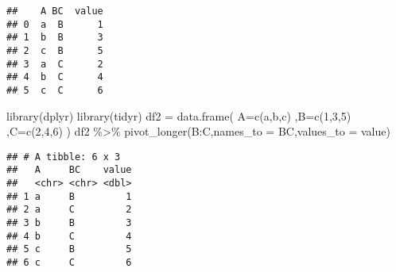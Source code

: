\documentclass[
]{article}
\newenvironment{Shaded}{\begin{snugshade}}{\end{snugshade}}
\newcommand{\AttributeTok}[1]{\textcolor[rgb]{0.77,0.63,0.00}{#1}}
\newcommand{\DecValTok}[1]{\textcolor[rgb]{0.00,0.00,0.81}{#1}}
\newcommand{\FunctionTok}[1]{\textcolor[rgb]{0.00,0.00,0.00}{#1}}
\newcommand{\NormalTok}[1]{#1}
\newcommand{\OtherTok}[1]{\textcolor[rgb]{0.56,0.35,0.01}{#1}}
\newcommand{\SpecialCharTok}[1]{\textcolor[rgb]{0.00,0.00,0.00}{#1}}
\newcommand{\StringTok}[1]{\textcolor[rgb]{0.31,0.60,0.02}{#1}}
\begin{document}
\begin{verbatim}
##    A BC  value
## 0  a  B      1
## 1  b  B      3
## 2  c  B      5
## 3  a  C      2
## 4  b  C      4
## 5  c  C      6
\end{verbatim}

\begin{Shaded}
\begin{Highlighting}[]
\FunctionTok{library}\NormalTok{(dplyr)}
\FunctionTok{library}\NormalTok{(tidyr)}
\NormalTok{df2 }\OtherTok{=} \FunctionTok{data.frame}\NormalTok{(}
  \AttributeTok{A=}\FunctionTok{c}\NormalTok{(}\StringTok{\textquotesingle{}a\textquotesingle{}}\NormalTok{,}\StringTok{\textquotesingle{}b\textquotesingle{}}\NormalTok{,}\StringTok{\textquotesingle{}c\textquotesingle{}}\NormalTok{)}
\NormalTok{  ,}\AttributeTok{B=}\FunctionTok{c}\NormalTok{(}\DecValTok{1}\NormalTok{,}\DecValTok{3}\NormalTok{,}\DecValTok{5}\NormalTok{)}
\NormalTok{  ,}\AttributeTok{C=}\FunctionTok{c}\NormalTok{(}\DecValTok{2}\NormalTok{,}\DecValTok{4}\NormalTok{,}\DecValTok{6}\NormalTok{)}
\NormalTok{  )}
\NormalTok{df2 }\SpecialCharTok{\%\textgreater{}\%} 
  \FunctionTok{pivot\_longer}\NormalTok{(B}\SpecialCharTok{:}\NormalTok{C,}\AttributeTok{names\_to =} \StringTok{\textquotesingle{}BC\textquotesingle{}}\NormalTok{,}\AttributeTok{values\_to =} \StringTok{\textquotesingle{}value\textquotesingle{}}\NormalTok{)}
\end{Highlighting}
\end{Shaded}

\begin{verbatim}
## # A tibble: 6 x 3
##   A     BC    value
##   <chr> <chr> <dbl>
## 1 a     B         1
## 2 a     C         2
## 3 b     B         3
## 4 b     C         4
## 5 c     B         5
## 6 c     C         6
\end{verbatim}
\end{document}
